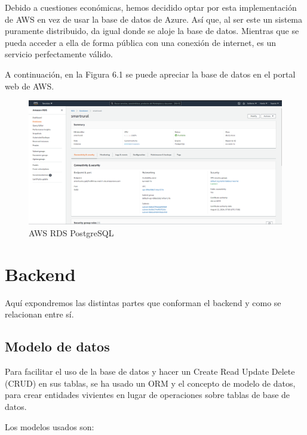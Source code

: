Debido a cuestiones económicas, hemos decidido optar por esta implementación de AWS en vez de usar la base de datos de Azure. Así que, al ser este un sistema puramente distribuido, da igual donde se aloje la base de datos. Mientras que se pueda acceder a ella de forma pública con una conexión de internet, es un servicio perfectamente válido.

A continuación, en la Figura 6.1 se puede apreciar la base de datos en el portal web de AWS.

\begin{figure}[H]
    \centering
    \includegraphics[width=1\linewidth]{images/implementation/database/aws rds.png}
    \caption{AWS RDS PostgreSQL}
\end{figure}

\section{Backend}
Aquí expondremos las distintas partes que conforman el backend y como se relacionan entre sí.

\subsection{Modelo de datos}
Para facilitar el uso de la base de datos y hacer un Create Read Update Delete (CRUD) en sus tablas, se ha usado un ORM y el concepto de modelo de datos, para crear entidades vivientes en lugar de operaciones sobre tablas de base de datos.

Los modelos usados son:

